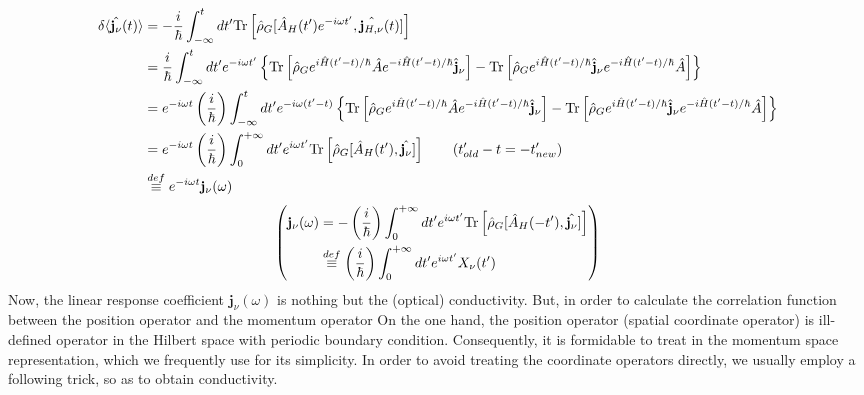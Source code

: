 \begin{equation}
\begin{aligned}
\delta\langle\hat {\mathbf{j}_\nu}(t)\rangle&=- \frac{i}{\hbar} \int_{-\infty}^t dt'\text{Tr} \left[ \hat \rho _G [\hat A_H(t')e^{-i\omega t'},\hat {\mathbf{j}_{H,\nu}}(t)]\right]\\
&= \frac{i}{\hbar} \int_{-\infty}^t dt'e^{-i\omega t'} \left\{ \text{Tr} \left[ \hat \rho _G e^{i\hat H(t'-t)/\hbar} \hat A  e^{-i\hat H(t'-t)/\hbar} \hat{\mathbf j}_\nu \right] -\text{Tr} \left[ \hat \rho _G e^{i\hat H(t'-t)/\hbar} \hat {\mathbf{j}}_\nu  e^{-i\hat H(t'-t)/\hbar} \hat{A} \right] \right\}\\
&=e^{-i\omega t} \left(\frac{i}{\hbar} \right)\int_{-\infty}^t dt'e^{-i\omega( t'-t)}  \left\{ \text{Tr} \left[ \hat \rho _G e^{i\hat H(t'-t)/\hbar} \hat A  e^{-i\hat H(t'-t)/\hbar} \hat{\mathbf j}_\nu \right] -\text{Tr} \left[ \hat \rho _G e^{i\hat H(t'-t)/\hbar} \hat {\mathbf{j}}_\nu  e^{-i\hat H(t'-t)/\hbar} \hat{A} \right] \right\}\\
&=e^{-i\omega t} \left(\frac{i}{\hbar}\right) \int_{0}^{+\infty} dt' e^{i\omega t'} \text{Tr} \left[ \hat \rho _G [\hat A_H(t'),\hat {\mathbf{j}_{\nu}}]\right] \qquad (t'_{old}-t=-t'_{new})\\
&\overset{def}{\equiv} e^{-i\omega t} \mathbf j_\nu (\omega)
\end{aligned}
\end{equation}
\begin{equation}\label{eq4.8.9}
\left(
\begin{aligned}
\mathbf j_\nu (\omega)& = -\left(\frac{i}{\hbar}\right) \int_{0}^{+\infty} dt' e^{i\omega t'} \text{Tr} \left[ \hat \rho _G [\hat A_H(-t'),\hat {\mathbf{j}_{\nu}}]\right] \\
&\overset{def}{\equiv} \left(\frac{i}{\hbar}\right) \int_{0}^{+\infty} dt' e^{i\omega t'} X_\nu(t')
\end{aligned}
\right)
\end{equation}
 Now, the linear response coefficient $\mathbf j_\nu(\omega)$ is nothing but the (optical) conductivity.
 But, in order to calculate the correlation function between the position operator and the momentum operator
 On the one hand, the position operator (spatial coordinate operator) is ill-defined operator in the Hilbert space with periodic boundary condition.
 Consequently, it is formidable to treat in the momentum space representation, which we frequently use for its simplicity.
 In order to avoid treating the coordinate operators directly, we usually employ a following trick, so as to obtain conductivity.
